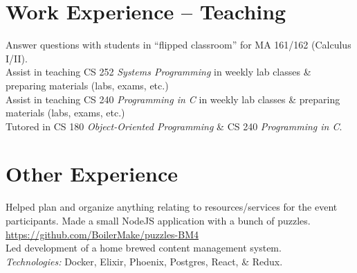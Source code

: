 \documentclass[11pt,letter,sans]{moderncv}
\begin{document}
\section{Work Experience -- Teaching}
Answer questions with students in ``flipped classroom'' for MA 161/162 (Calculus I/II).
\\
Assist in teaching CS 252 \textit{Systems Programming} in weekly lab classes \& preparing materials (labs, exams, etc.)
\\
Assist in teaching CS 240 \textit{Programming in C} in weekly lab classes \& preparing materials (labs, exams, etc.)
\\
Tutored in CS 180 \textit{Object-Oriented Programming} \& CS 240 \textit{Programming in C}.
\section{Other Experience}
Helped plan and organize anything relating to resources/services for the event participants.
Made a small NodeJS application with a bunch of puzzles. \url{https://github.com/BoilerMake/puzzles-BM4}
\\
Led development of a home brewed content management system.
\\
\textit{Technologies:} Docker, Elixir, Phoenix, Postgres, React, \& Redux.
\end{document}
